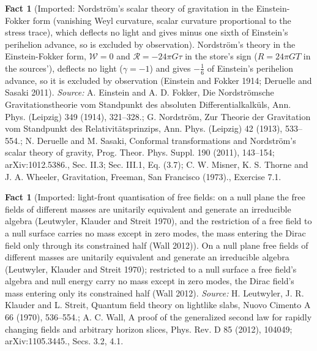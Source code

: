 \documentclass[11pt]{article}
\theoremstyle{definition}
\newtheorem{fact}[theorem]{Fact}
\theoremstyle{plain}
\begin{document}
\begin{fact}[Imported: Nordstr\"om's scalar theory of gravitation in the Einstein-Fokker form (vanishing Weyl curvature, scalar curvature proportional to the stress trace), which deflects no light and gives minus one sixth of Einstein's perihelion advance, so is excluded by observation]\label{c:synthesis.imported-nordstrom-scalar-theory-einstein-fokker-form}
Nordstr\"om's theory in the Einstein-Fokker form, $\mathcal{W} = 0$ and $\mathcal{R} = -24\pi G\tau$ in the store's sign ($R = 24\pi G T$ in the sources'), deflects no light ($\gamma = -1$) and gives $-\tfrac16$ of Einstein's perihelion advance, so it is excluded by observation (Einstein and Fokker 1914; Deruelle and Sasaki 2011).
\emph{Source:} A. Einstein and A. D. Fokker, Die Nordstr\"omsche Gravitationstheorie vom Standpunkt des absoluten Differentialkalk\"uls, Ann. Phys. (Leipzig) 349 (1914), 321--328.; G. Nordstr\"om, Zur Theorie der Gravitation vom Standpunkt des Relativit\"atsprinzips, Ann. Phys. (Leipzig) 42 (1913), 533--554.; N. Deruelle and M. Sasaki, Conformal transformations and Nordstr\"om's scalar theory of gravity, Prog. Theor. Phys. Suppl. 190 (2011), 143--154; arXiv:1012.5386., Sec. II.3; Sec. III.1, Eq. (3.7); C. W. Misner, K. S. Thorne and J. A. Wheeler, Gravitation, Freeman, San Francisco (1973)., Exercise 7.1.
\end{fact}

\begin{fact}[Imported: light-front quantisation of free fields: on a null plane the free fields of different masses are unitarily equivalent and generate an irreducible algebra (Leutwyler, Klauder and Streit 1970), and the restriction of a free field to a null surface carries no mass except in zero modes, the mass entering the Dirac field only through its constrained half (Wall 2012)]\label{c:synthesis.imported-null-plane-restriction-of-free-fields-is-mass-independent}
On a null plane free fields of different masses are unitarily equivalent and generate an irreducible algebra (Leutwyler, Klauder and Streit 1970); restricted to a null surface a free field's algebra and null energy carry no mass except in zero modes, the Dirac field's mass entering only its constrained half (Wall 2012).
\emph{Source:} H. Leutwyler, J. R. Klauder and L. Streit, Quantum field theory on lightlike slabs, Nuovo Cimento A 66 (1970), 536--554.; A. C. Wall, A proof of the generalized second law for rapidly changing fields and arbitrary horizon slices, Phys. Rev. D 85 (2012), 104049; arXiv:1105.3445., Secs. 3.2, 4.1.
\end{fact}
\end{document}
